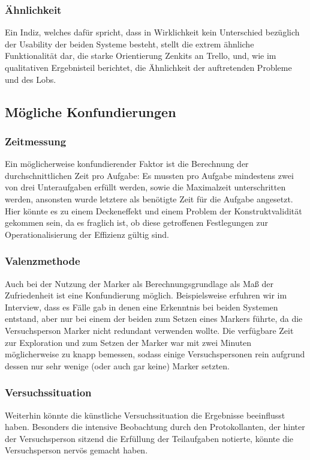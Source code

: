 \subsubsection{Ähnlichkeit}
Ein Indiz, welches dafür spricht, dass in Wirklichkeit kein Unterschied bezüglich der Usability der beiden Systeme besteht, stellt die extrem ähnliche Funktionalität dar, die starke Orientierung Zenkits an Trello, und, wie im qualitativen Ergebnisteil berichtet, die Ähnlichkeit der auftretenden Probleme und des Lobs. 








\subsection{Mögliche Konfundierungen}

\subsubsection{Zeitmessung}
Ein möglicherweise konfundierender Faktor ist die Berechnung der durchschnittlichen Zeit pro Aufgabe: Es mussten pro Aufgabe mindestens zwei von drei Unteraufgaben erfüllt werden, sowie die Maximalzeit unterschritten werden, ansonsten wurde letztere als benötigte Zeit für die Aufgabe angesetzt. Hier könnte es zu einem Deckeneffekt und einem Problem der Konstruktvalidität gekommen sein, da es fraglich ist, ob diese getroffenen Festlegungen zur Operationalisierung der Effizienz gültig sind.

\subsubsection{Valenzmethode}
Auch bei der Nutzung der Marker als Berechnungsgrundlage als Maß der Zufriedenheit ist eine Konfundierung möglich. Beispielsweise erfuhren wir im Interview, dass es Fälle gab in denen eine Erkenntnis bei beiden Systemen entstand, aber nur bei einem der beiden zum Setzen eines Markers führte, da die Versuchsperson Marker nicht redundant verwenden wollte. Die verfügbare Zeit zur Exploration und zum Setzen der Marker war mit zwei Minuten möglicherweise zu knapp bemessen, sodass einige Versuchspersonen rein aufgrund dessen nur sehr wenige (oder auch gar keine) Marker setzten. 

\subsubsection{Versuchssituation}
Weiterhin könnte die künstliche Versuchssituation die Ergebnisse beeinflusst haben. Besonders die intensive Beobachtung durch den Protokollanten, der hinter der Versuchsperson sitzend die Erfüllung der Teilaufgaben notierte, könnte die Versuchsperson nervös gemacht haben.

